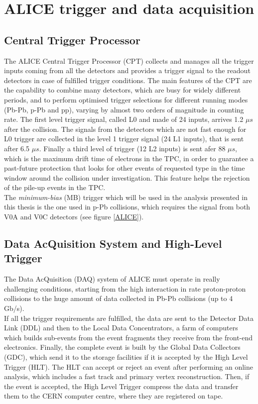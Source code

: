 \documentclass[b5paper,10pt,twoside,oldstyle,classica]{toptesi}
\begin{document}
\section{ALICE trigger and data acquisition}
\subsection{Central Trigger Processor}
\label{MBtrigger_sec}
The ALICE Central Trigger Processor (CPT) \cite{ALICEtrigger} collects and manages all the trigger inputs coming from all the detectors and provides a trigger signal to the readout detectors in case of fulfilled trigger conditions. The main features of the CPT are the capability to combine many detectors, which are busy for widely different periods, and to perform optimised trigger selections for different running modes (Pb-Pb, p-Pb and pp), varying by almost two orders of magnitude in counting rate. The first level trigger signal, called L0 and made of 24 inputs, arrives 1.2 $\mu s$ after the collision. The signals from the detectors which are not fast enough for L0 trigger are collected in the level 1 trigger signal (24 L1 inputs), that is sent after 6.5 $\mu s$. Finally a third level of trigger (12 L2 inputs) is sent afer 88 $\mu s$, which is the maximum drift time of electrons in the TPC, in order to guarantee a past-future protection that looks for other events of requested type in the time window around the collision under investigation. This feature helps the rejection of the pile-up events in the TPC.\\
The \textit{minimum-bias} (MB) trigger which will be used in the analysis presented in this thesis is the one used in p-Pb collisions, which requires the signal from both V0A and V0C detectors (see figure \ref{ALICE}).
\subsection{Data AcQuisition System and High-Level Trigger}
The Data AcQuisition (DAQ) system of ALICE must operate in really challenging conditions, starting from the high interaction in rate proton-proton collisions to the huge amount of data collected in Pb-Pb collisions (up to 4 Gb/s).\\
If all the trigger requirements are fulfilled, the data are sent to the Detector Data Link (DDL) and then to the Local Data Concentrators, a farm of computers which builds sub-events from the event fragments they receive from the front-end electronics. Finally, the complete event is built by the Global Data Collectors (GDC), which send it to the storage facilities if it is accepted by the High Level Trigger (HLT). The HLT can accept or reject an event after performing an online analysis, which includes a fast track and primary vertex reconstruction. Then, if the event is accepted, the High Level Trigger compress the data and transfer them to the CERN computer centre, where they are registered on tape.      
\end{document}

